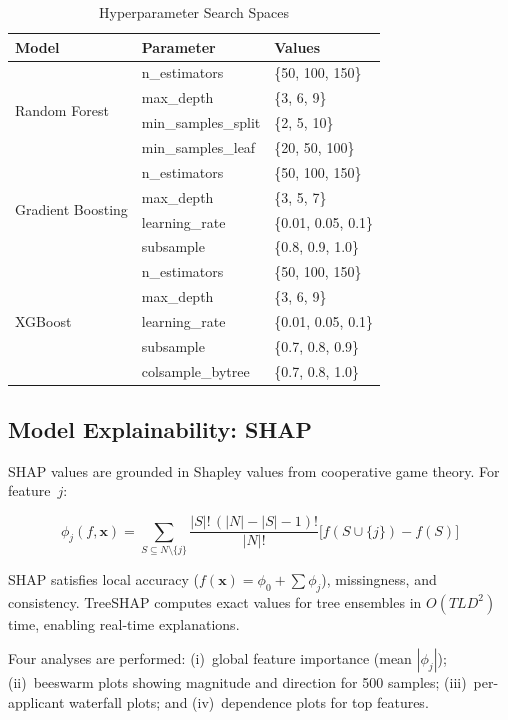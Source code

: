 \documentclass[journal]{IEEEtran}
\begin{document}
\begin{table}[!t]
\centering
\caption{Hyperparameter Search Spaces}
\label{tab:search_spaces}
\begin{tabular}{llp{2.8cm}}
\toprule
\textbf{Model} & \textbf{Parameter} & \textbf{Values} \\
\midrule
\multirow{4}{*}{Random Forest}
  & n\_estimators & \{50, 100, 150\} \\
  & max\_depth & \{3, 6, 9\} \\
  & min\_samples\_split & \{2, 5, 10\} \\
  & min\_samples\_leaf & \{20, 50, 100\} \\
\midrule
\multirow{4}{*}{Gradient Boosting}
  & n\_estimators & \{50, 100, 150\} \\
  & max\_depth & \{3, 5, 7\} \\
  & learning\_rate & \{0.01, 0.05, 0.1\} \\
  & subsample & \{0.8, 0.9, 1.0\} \\
\midrule
\multirow{5}{*}{XGBoost}
  & n\_estimators & \{50, 100, 150\} \\
  & max\_depth & \{3, 6, 9\} \\
  & learning\_rate & \{0.01, 0.05, 0.1\} \\
  & subsample & \{0.7, 0.8, 0.9\} \\
  & colsample\_bytree & \{0.7, 0.8, 1.0\} \\
\bottomrule
\end{tabular}
\end{table}


\subsection{Model Explainability: SHAP}

SHAP values are grounded in Shapley values from cooperative game theory. For feature~$j$:

\begin{equation}
\phi_j(f, \mathbf{x}) = \!\!\!\sum_{S \subseteq N \setminus \{j\}} \frac{|S|!\,(|N|{-}|S|{-}1)!}{|N|!}\bigl[f(S \cup \{j\}) - f(S)\bigr]
\end{equation}

SHAP satisfies local accuracy ($f(\mathbf{x}) = \phi_0 + \sum \phi_j$), missingness, and consistency. TreeSHAP computes exact values for tree ensembles in $O(TLD^2)$ time, enabling real-time explanations.

Four analyses are performed: (i)~global feature importance (mean $|\phi_j|$); (ii)~beeswarm plots showing magnitude and direction for 500 samples; (iii)~per-applicant waterfall plots; and (iv)~dependence plots for top features.
\end{document}
